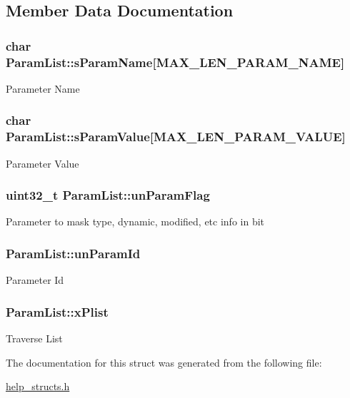 \subsection{Member Data Documentation}
\hypertarget{structParamList_a2705606e7fccfd011246eda4370cb8f0}{
\subsubsection[{s\-Param\-Name}]{\setlength{\rightskip}{0pt plus 5cm}char Param\-List\-::s\-Param\-Name\mbox{[}{\bf M\-A\-X\-\_\-\-L\-E\-N\-\_\-\-P\-A\-R\-A\-M\-\_\-\-N\-A\-M\-E}\mbox{]}}}\label{structParamList_a2705606e7fccfd011246eda4370cb8f0}
Parameter Name \hypertarget{structParamList_a0de8a21274ebfa45ff846cd53e5079fd}{
\subsubsection[{s\-Param\-Value}]{\setlength{\rightskip}{0pt plus 5cm}char Param\-List\-::s\-Param\-Value\mbox{[}{\bf M\-A\-X\-\_\-\-L\-E\-N\-\_\-\-P\-A\-R\-A\-M\-\_\-\-V\-A\-L\-U\-E}\mbox{]}}}\label{structParamList_a0de8a21274ebfa45ff846cd53e5079fd}
Parameter Value \hypertarget{structParamList_a36893c4507f528c478b7f22e0b1277a4}{
\subsubsection[{un\-Param\-Flag}]{\setlength{\rightskip}{0pt plus 5cm}uint32\-\_\-t Param\-List\-::un\-Param\-Flag}}\label{structParamList_a36893c4507f528c478b7f22e0b1277a4}
Parameter to mask type, dynamic, modified, etc info in bit \hypertarget{structParamList_a84f52fb3f1b8ea341ccf0ebbb7e562f6}{
\subsubsection[{un\-Param\-Id}]{ Param\-List\-::un\-Param\-Id}}\label{structParamList_a84f52fb3f1b8ea341ccf0ebbb7e562f6}
Parameter Id \hypertarget{structParamList_ab46066381446f338d777c744f01d0955}{
\subsubsection[{x\-Plist}]{ Param\-List\-::x\-Plist}}\label{structParamList_ab46066381446f338d777c744f01d0955}
Traverse List 

The documentation for this struct was generated from the following file\-:\begin{DoxyCompactItemize}
\item 
\hyperlink{help__structs_8h}{help\-\_\-structs.\-h}\end{DoxyCompactItemize}
